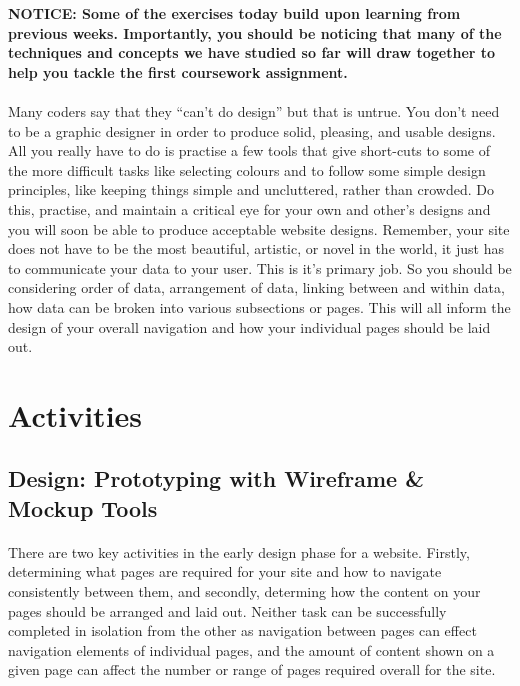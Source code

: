\documentclass[10pt, a4paper, twosize]{article}
\begin{document}
\begin{framed}
{\bf{NOTICE:}  Some of the exercises today build upon learning from previous weeks. Importantly, you should be noticing that many of the techniques and concepts we have studied so far will draw together to help you tackle the first coursework assignment.}
\end{framed}


\paragraph{} Many coders say that they ``can't do design'' but that is untrue. You don't need to be a graphic designer in order to produce solid, pleasing, and usable designs. All you really have to do is practise a few tools that give short-cuts to some of the more difficult tasks like selecting colours and to follow some simple design principles, like keeping things simple and uncluttered, rather than crowded. Do this, practise, and maintain a critical eye for your own and other's designs and you will soon be able to produce acceptable website designs. Remember, your site does not have to be the most beautiful, artistic, or novel in the world, it just has to communicate your data to your user. This is it's primary job. So you should be considering order of data, arrangement of data, linking between and within data, how data can be broken into various subsections or pages. This will all inform the design of your overall navigation and how your individual pages should be laid out. 

\section{Activities}

\subsection{Design: Prototyping with Wireframe \& Mockup Tools}
\paragraph{} There are two key activities in the early design phase for a website. Firstly, determining what pages are required for your site and how to navigate consistently between them, and secondly, determing how the content on your pages should be arranged and laid out. Neither task can be successfully completed in isolation from the other as navigation between pages can effect navigation elements of individual pages, and the amount of content shown on a given page can affect the number or range of pages required overall for the site.
\end{document}
